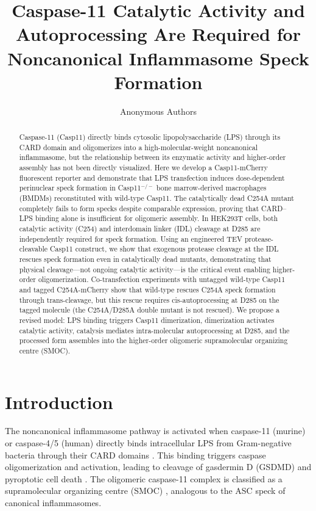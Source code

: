 \documentclass[11pt]{article}
\title{Caspase-11 Catalytic Activity and Autoprocessing Are Required for Noncanonical Inflammasome Speck Formation}
\author{Anonymous Authors}
\date{}
\begin{document}
\maketitle

\begin{abstract}
Caspase-11 (Casp11) directly binds cytosolic lipopolysaccharide (LPS) through its CARD domain and oligomerizes into a high-molecular-weight noncanonical inflammasome, but the relationship between its enzymatic activity and higher-order assembly has not been directly visualized. Here we develop a Casp11-mCherry fluorescent reporter and demonstrate that LPS transfection induces dose-dependent perinuclear speck formation in Casp11$^{-/-}$ bone marrow-derived macrophages (BMDMs) reconstituted with wild-type Casp11. The catalytically dead C254A mutant completely fails to form specks despite comparable expression, proving that CARD--LPS binding alone is insufficient for oligomeric assembly. In HEK293T cells, both catalytic activity (C254) and interdomain linker (IDL) cleavage at D285 are independently required for speck formation. Using an engineered TEV protease-cleavable Casp11 construct, we show that exogenous protease cleavage at the IDL rescues speck formation even in catalytically dead mutants, demonstrating that physical cleavage---not ongoing catalytic activity---is the critical event enabling higher-order oligomerization. Co-transfection experiments with untagged wild-type Casp11 and tagged C254A-mCherry show that wild-type rescues C254A speck formation through trans-cleavage, but this rescue requires cis-autoprocessing at D285 on the tagged molecule (the C254A/D285A double mutant is not rescued). We propose a revised model: LPS binding triggers Casp11 dimerization, dimerization activates catalytic activity, catalysis mediates intra-molecular autoprocessing at D285, and the processed form assembles into the higher-order oligomeric supramolecular organizing centre (SMOC).
\end{abstract}

\section{Introduction}

The noncanonical inflammasome pathway is activated when caspase-11 (murine) or caspase-4/5 (human) directly binds intracellular LPS from Gram-negative bacteria through their CARD domains \citep{shi2014inflammatory, man2017caspase4}. This binding triggers caspase oligomerization and activation, leading to cleavage of gasdermin D (GSDMD) and pyroptotic cell death \citep{kayagaki2015caspase11, shi2015cleavage}. The oligomeric caspase-11 complex is classified as a supramolecular organizing centre (SMOC) \citep{lee2018smoc}, analogous to the ASC speck of canonical inflammasomes.
\end{document}

